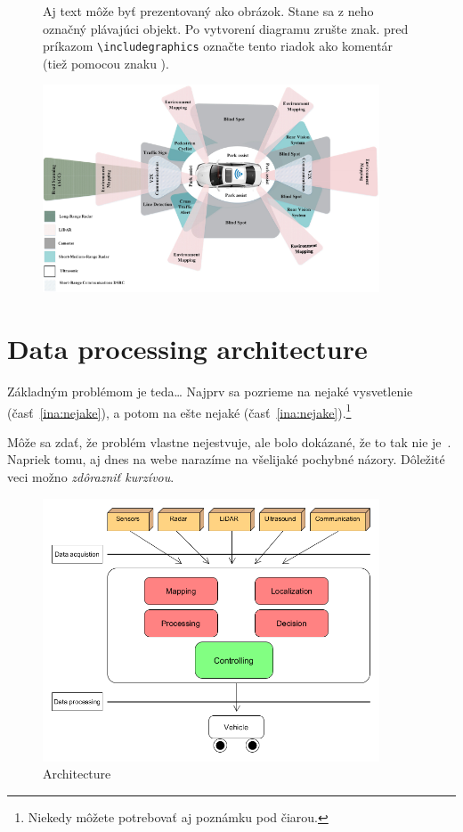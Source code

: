 \documentclass[11pt,oneside,english,a4paper]{article}
\begin{document}
\begin{figure}
Aj text môže byť prezentovaný ako obrázok. Stane sa z neho označný plávajúci objekt. Po vytvorení diagramu zrušte znak. pred príkazom \verb|\includegraphics| označte tento riadok ako komentár (tiež pomocou znaku ).


\centering
    \includegraphics[width=10cm]{sensors.png}
    \caption{}
    \label{fig:sensors}
    
\end{figure}

\section{Data processing architecture} \label{architecture}

Základným problémom je teda\ldots{} Najprv sa pozrieme na nejaké vysvetlenie (časť~\ref{ina:nejake}), a potom na ešte nejaké (časť~\ref{ina:nejake}).\footnote{Niekedy môžete potrebovať aj poznámku pod čiarou.}

Môže sa zdať, že problém vlastne nejestvuje\cite{Coplien:MPD}, ale bolo dokázané, že to tak nie je~\cite{Czarnecki:Staged, Czarnecki:Progress}. Napriek tomu, aj dnes na webe narazíme na všelijaké pochybné názory\cite{PLP-Framework}. Dôležité veci možno \emph{zdôrazniť kurzívou}.

\begin{figure}


\centering
    \includegraphics[width=10cm]{architecture.png}
    \caption{Architecture}
    \label{fig:architecture}

\end{figure}
\end{document}
